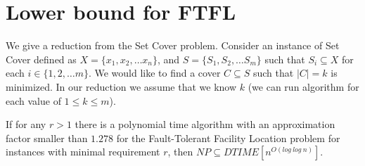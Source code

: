 \documentclass{llncs}
\begin{document}
\section{Lower bound for FTFL}
We give a reduction from the Set Cover problem. Consider an instance of Set Cover defined as $X = \{x_1, x_2, \dots x_n\}$, and $S = \{S_1, S_2, \dots S_m\}$ such that $S_i \subseteq X$ for each $i \in \{1, 2, \dots m\}$. We would like to find a cover $C \subseteq S$ such that $|C| = k$ is minimized. In our reduction we assume that we know $k$ (we can run algorithm for each value of $1 \leq k \leq m$).

\begin{theorem}
\label{hardness_of_FTFL}
If for any $r > 1$ there is a polynomial time algorithm with an approximation factor smaller than $1.278$ for the Fault-Tolerant Facility Location problem for instances with minimal requirement $r$, then $NP \subseteq DTIME[n^{O(log~log~n)}]$.
\end{theorem}
\end{document}
